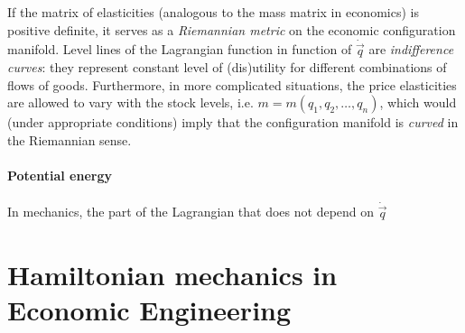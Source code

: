 If the matrix of elasticities (analogous to the mass matrix in economics) is positive definite, it serves as a \emph{Riemannian metric} on the economic configuration manifold. Level lines of the Lagrangian function in function of $\dot{\vec{q}}$ are \emph{indifference curves}: they represent constant level of (dis)utility for different combinations of flows of goods. Furthermore, in more complicated situations, the price elasticities are allowed to vary with the stock levels, i.e. $ m = m(q_1, q_2, \ldots, q_n)$, which would (under appropriate conditions) imply that the  configuration manifold is \emph{curved} in the Riemannian sense.

\paragraph{Potential energy} In mechanics, the part of the Lagrangian that does not depend on $\dot{\vec{q}}$

\section{Hamiltonian mechanics in Economic Engineering}



